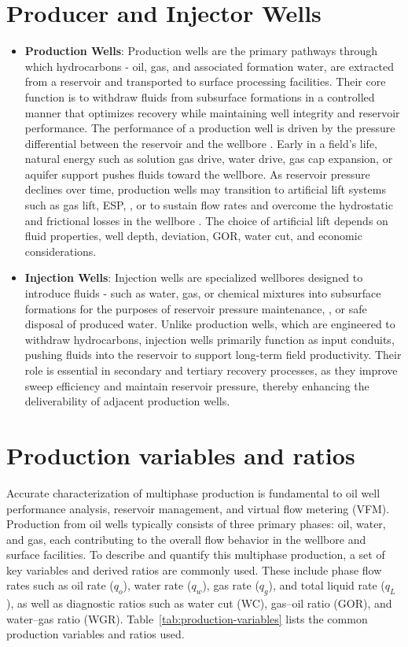 \documentclass[12pt,APA]{uomthesis}
\begin{document}
\section{Producer and Injector Wells}
\begin{itemize}
    \item \textbf{Production Wells}: Production wells are the primary pathways through which hydrocarbons - oil, gas, and associated formation water, are extracted from a reservoir and transported to surface processing facilities. Their core function is to withdraw fluids from subsurface formations in a controlled manner that optimizes recovery while maintaining well integrity and reservoir performance. The performance of a production well is driven by the pressure differential between the reservoir and the wellbore \citep{ahmed2010reservoir}. Early in a field's life, natural energy such as solution gas drive, water drive, gas cap expansion, or aquifer support pushes fluids toward the wellbore. As reservoir pressure declines over time, production wells may transition to artificial lift systems such as gas lift, ESP, , or  to sustain flow rates and overcome the hydrostatic and frictional losses in the wellbore \citep{brown1984artificial}. The choice of artificial lift depends on fluid properties, well depth, deviation, GOR, water cut, and economic considerations.
    \item \textbf{Injection Wells}: Injection wells are specialized wellbores designed to introduce fluids - such as water, gas, or chemical mixtures into subsurface formations for the purposes of reservoir pressure maintenance,  \citep{lake2014enhanced}, or safe disposal of produced water. Unlike production wells, which are engineered to withdraw hydrocarbons, injection wells primarily function as input conduits, pushing fluids into the reservoir to support long-term field productivity. Their role is essential in secondary and tertiary recovery processes, as they improve sweep efficiency and maintain reservoir pressure, thereby enhancing the deliverability of adjacent production wells.
\end{itemize}

\section{Production variables and ratios}
Accurate characterization of multiphase production is fundamental to oil well performance analysis, reservoir management, and virtual flow metering (VFM). Production from oil wells typically consists of three primary phases: oil, water, and gas, each contributing to the overall flow behavior in the wellbore and surface facilities.
To describe and quantify this multiphase production, a set of key variables and derived ratios are commonly used. These include phase flow rates such as oil rate ($q_o$), water rate ($q_w$), gas rate ($q_g$), and total liquid rate ($q_L$), as well as diagnostic ratios such as water cut (WC), gas--oil ratio (GOR), and water--gas ratio (WGR).
Table~\ref{tab:production-variables} lists the common production variables and ratios used.
\end{document}
